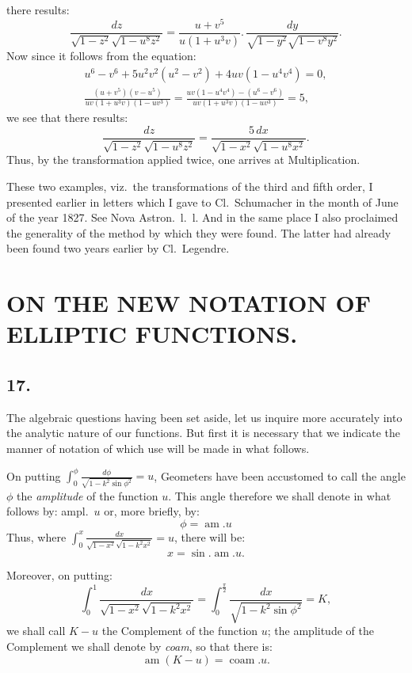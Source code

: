 \documentclass{article}
\begin{document}
there results:
\[
\frac{dz}{\sqrt{1-z^{2}}\sqrt{1-u^{8}z^{2}}}=\frac{u+v^{5}}{u(1+u^{3}v)}.\,\frac{dy}{\sqrt{1-y^{2}}\sqrt{1-v^{8}y^{2}}}.
\]
Now since it follows from the equation:
\[
\begin{gathered}
u^{6}-v^{6}+5u^{2}v^{2}(u^{2}-v^{2})+4uv(1-u^{4}v^{4})=0,\\
\frac{(u+v^{5})(v-u^{5})}{uv(1+u^{3}v)(1-uv^{3})}=\frac{uv(1-u^{4}v^{4})-(u^{6}-v^{6})}{uv(1+u^{3}v)(1-uv^{3})}=5,
\end{gathered}
\]
we see that there results:
\[
\frac{dz}{\sqrt{1-z^{2}}\sqrt{1-u^{8}z^{2}}}=\frac{5\,dx}{\sqrt{1-x^{2}}\sqrt{1-u^{8}x^{2}}}.
\]
Thus, by the transformation applied twice, one arrives at Multiplication.

These two examples, viz.\ the transformations of the third and fifth order, I presented earlier in letters which I gave to Cl.\ Schumacher in the month of June of the year 1827. See Nova Astron.\ l.\ l. And in the same place I also proclaimed the generality of the method by which they were found. The latter had already been found two years earlier by Cl.\ Legendre.

\section*{ON THE NEW NOTATION OF ELLIPTIC FUNCTIONS.}

\subsection*{17.}

The algebraic questions having been set aside, let us inquire more accurately into the analytic nature of our functions. But first it is necessary that we indicate the manner of notation of which use will be made in what follows.

On putting $\displaystyle\int_{0}^{\phi}\frac{d\phi}{\sqrt{1-k^{2}\sin\phi^{2}}}=u$, Geometers have been accustomed to call the angle $\phi$ the \emph{amplitude} of the function $u$. This angle therefore we shall denote in what follows by: ampl.\ $u$ or, more briefly, by:
\[
\phi=\operatorname{am}.u
\]
Thus, where $\displaystyle\int_{0}^{x}\frac{dx}{\sqrt{1-x^{2}}\sqrt{1-k^{2}x^{2}}}=u$, there will be:
\[
x=\sin.\operatorname{am}.u.
\]

Moreover, on putting:
\[
\int_{0}^{1}\frac{dx}{\sqrt{1-x^{2}}\sqrt{1-k^{2}x^{2}}}=\int_{0}^{\frac{\pi}{2}}\frac{dx}{\sqrt{1-k^{2}\sin\phi^{2}}}=K,
\]
we shall call $K-u$ the Complement of the function $u$; the amplitude of the Complement we shall denote by \emph{coam}, so that there is:
\[
\operatorname{am}(K-u)=\operatorname{coam}.u.
\]
\end{document}
